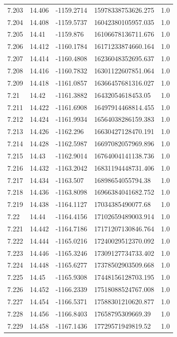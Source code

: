 \begin{tabular}{lllll}
7.203 & 14.406 & -1159.2714 & 15978338753626.275 & 1.0 \\
7.204 & 14.408 & -1159.5737 & 16042380105957.035 & 1.0 \\
7.205 & 14.41 & -1159.876 & 16106678136711.676 & 1.0 \\
7.206 & 14.412 & -1160.1784 & 16171233874660.164 & 1.0 \\
7.207 & 14.414 & -1160.4808 & 16236048352695.637 & 1.0 \\
7.208 & 14.416 & -1160.7832 & 16301122607851.064 & 1.0 \\
7.209 & 14.418 & -1161.0857 & 16366457681316.027 & 1.0 \\
7.21 & 14.42 & -1161.3882 & 16432054618453.05 & 1.0 \\
7.211 & 14.422 & -1161.6908 & 16497914468814.455 & 1.0 \\
7.212 & 14.424 & -1161.9934 & 16564038286159.383 & 1.0 \\
7.213 & 14.426 & -1162.296 & 16630427128470.191 & 1.0 \\
7.214 & 14.428 & -1162.5987 & 16697082057969.896 & 1.0 \\
7.215 & 14.43 & -1162.9014 & 16764004141138.736 & 1.0 \\
7.216 & 14.432 & -1163.2042 & 16831194448731.406 & 1.0 \\
7.217 & 14.434 & -1163.507 & 16898654055794.38 & 1.0 \\
7.218 & 14.436 & -1163.8098 & 16966384041682.752 & 1.0 \\
7.219 & 14.438 & -1164.1127 & 17034385490077.68 & 1.0 \\
7.22 & 14.44 & -1164.4156 & 17102659489003.914 & 1.0 \\
7.221 & 14.442 & -1164.7186 & 17171207130846.764 & 1.0 \\
7.222 & 14.444 & -1165.0216 & 17240029512370.092 & 1.0 \\
7.223 & 14.446 & -1165.3246 & 17309127734733.402 & 1.0 \\
7.224 & 14.448 & -1165.6277 & 17378502903509.668 & 1.0 \\
7.225 & 14.45 & -1165.9308 & 17448156128703.195 & 1.0 \\
7.226 & 14.452 & -1166.2339 & 17518088524767.008 & 1.0 \\
7.227 & 14.454 & -1166.5371 & 17588301210620.877 & 1.0 \\
7.228 & 14.456 & -1166.8403 & 17658795309669.39 & 1.0 \\
7.229 & 14.458 & -1167.1436 & 17729571949819.52 & 1.0 \\

\end{tabular}
